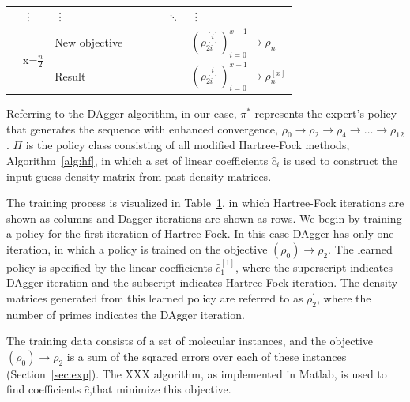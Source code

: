 \documentclass[twoside,11pt]{article}
\begin{document}
\begin{center}
\begin{table}[t]
{\begin{tabular}{|l|l|l|l|l|l|l|l|}
	& \vdots      & \vdots      &                &                &                & $\ddots$ &   \vdots \\ \cline{2-8} 
	& \multirow{2}{*}{ x=$\frac{n}{2}$} & New objective         &                         &                          &                            &  & $(\rho_{2i}^{[i]})_{i=0}^{x-1} \rightarrow \rho_{n}$     \\ \cline{3-8} 
	&                & Result  &                &                &                &  & $(\rho_{2i}^{[i]})_{i=0}^{x-1}\rightarrow \rho_{n}^{[x]}$ \\ \hline
	\end{tabular}}
	\label{tab:DAgger}
	\end{table}
\end{center} 

Referring to the DAgger algorithm, in our case, $\pi^*$ represents the expert's policy that generates the sequence with enhanced convergence, $\rho_0 \rightarrow \rho_2 \rightarrow  \rho_4 \rightarrow  \ldots \rightarrow  \rho_{12}$. $\Pi$ is the policy class consisting of all modified Hartree-Fock methods, Algorithm~\ref{alg:hf}, in which a set of linear coefficients $\hat{c}_i$ is used to construct the input guess density matrix from past density matrices.

The training process is visualized in Table~\ref{tab:DAgger}, in which Hartree-Fock iterations are shown as columns and Dagger iterations are shown as rows. We begin by training a policy for the first iteration of Hartree-Fock. In this case DAgger has only one iteration, in which a policy is trained on the objective $(\rho_0) \rightarrow \rho_2$. The learned policy is specified by the linear coefficients $\hat{c}^{[1]}_1$, where the superscript indicates DAgger iteration and the subscript indicates Hartree-Fock iteration. The density matrices generated from this learned policy are referred to as $\rho_2^{'}$, where the number of primes indicates the DAgger iteration.

The training data consists of a set of molecular instances, and the objective $(\rho_0) \rightarrow \rho_2$ is a sum of the sqrared errors over each of these instances (Section~\ref{sec:exp}). The XXX algorithm, as implemented in Matlab, is used to find coefficients $\hat{c}$,that minimize this objective. 
\end{document}
